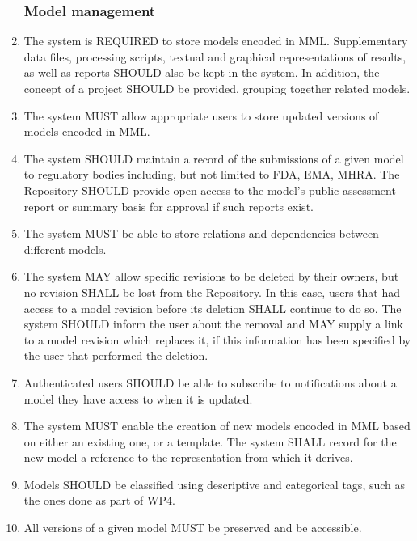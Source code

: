 \begin{enumerate}[1]
\subsubsection{Model management}
\item The system is REQUIRED to store models encoded in \gls{MML}. Supplementary data files, processing scripts, textual and graphical representations of results, as well as reports SHOULD also be kept in the system. In addition, the concept of a project SHOULD be provided, grouping together related models. 

\item The system MUST allow appropriate users to store updated versions of models encoded in MML.

\item The system SHOULD maintain a record of the submissions of a given model to regulatory bodies including, but not limited to FDA, EMA, MHRA. The Repository SHOULD provide open access to the model's public assessment report or summary basis for approval if such reports exist. 

\item The system MUST be able to store relations and dependencies between different models.

\item The system MAY allow specific \glspl{revision} to be deleted by their owners, but no revision SHALL be lost from the Repository. In this case, users that had access to a model revision before its deletion SHALL continue to do so. The system SHOULD inform the user about the removal and MAY supply a link to a model revision which replaces it, if this information has been specified by the user that performed the deletion. 

\item Authenticated users SHOULD be able to subscribe to notifications about a model they have access to when it is updated.

\item The system MUST enable the creation of new models encoded in MML based on either an existing one, or a template. The system SHALL record for the new model a reference  to the representation from which it derives.

\item Models SHOULD be classified using descriptive and categorical tags, such as the ones done as part of WP4.

\item All versions of a given model MUST be preserved and be accessible.


\end{enumerate}
